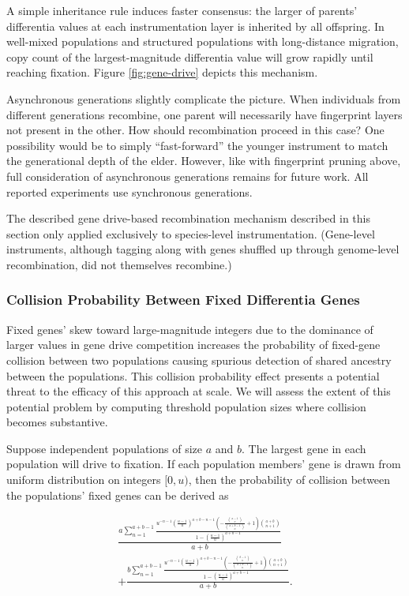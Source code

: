 A simple inheritance rule induces faster consensus: the larger of parents' differentia values at each instrumentation layer is inherited by all offspring.
In well-mixed populations and structured populations with long-distance migration, copy count of the largest-magnitude differentia value will grow rapidly until reaching fixation.
Figure \ref{fig:gene-drive} depicts this mechanism.

Asynchronous generations slightly complicate the picture.
When individuals from different generations recombine, one parent will necessarily have fingerprint layers not present in the other.
How should recombination proceed in this case?
One possibility would be to simply ``fast-forward'' the younger instrument to match the generational depth of the elder.
However, like with fingerprint pruning above, full consideration of asynchronous generations remains for future work.
All reported experiments use synchronous generations.

The described gene drive-based recombination mechanism described in this section only applied exclusively to species-level instrumentation.
(Gene-level instruments, although tagging along with genes shuffled up through genome-level recombination, did not themselves recombine.)

\subsubsection{Collision Probability Between Fixed Differentia Genes}
\label{sec:collision-probability}

Fixed genes' skew toward large-magnitude integers due to the dominance of larger values in gene drive competition increases the probability of fixed-gene collision between two populations causing spurious detection of shared ancestry between the populations.
This collision probability effect presents a potential threat to the efficacy of this approach at scale.
We will assess the extent of this potential problem by computing threshold population sizes where collision becomes substantive.

Suppose independent populations of size $a$ and $b$.
The largest gene in each population will drive to fixation.
If each population members' gene is drawn from uniform distribution on integers $[0, u)$, then the probability of collision between the populations' fixed genes can be derived as

\begin{align*}
\frac{a \sum_{n=1}^{a + b - 1} \frac{u^{- n - 1} \left(\frac{u - 1}{u}\right)^{a + b - n - 1} \left(- \frac{{\binom{a - 1}{n}}}{{\binom{a + b - 1}{n}}} + 1\right) {\binom{a + b}{n + 1}}}{1 - \left(\frac{u - 1}{u}\right)^{a + b - 1}}}{a + b} \\
+ \frac{b \sum_{n=1}^{a + b - 1} \frac{u^{- n - 1} \left(\frac{u - 1}{u}\right)^{a + b - n - 1} \left(- \frac{{\binom{b - 1}{n}}}{{\binom{a + b - 1}{n}}} + 1\right) {\binom{a + b}{n + 1}}}{1 - \left(\frac{u - 1}{u}\right)^{a + b - 1}}}{a + b}.
\end{align*}

